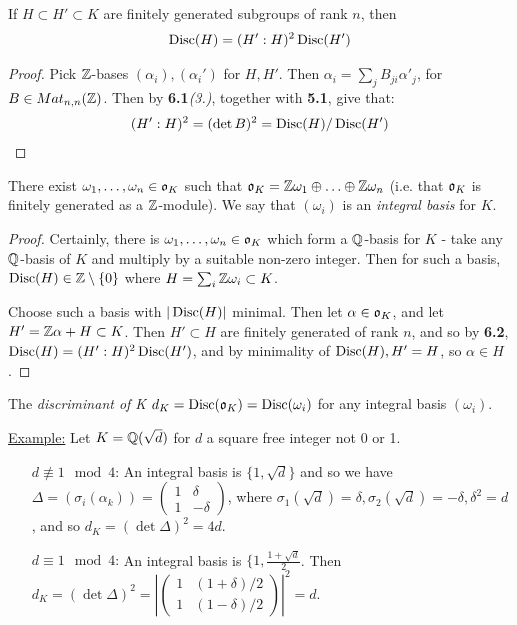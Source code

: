 \documentclass[10pt,a4paper]{article}
\begin{document}
\begin{lemma} If $H \subset H' \subset K$ are finitely generated subgroups of rank $n$, then
\begin{align*}
\operatorname{Disc}(H) = (H':H)^2\operatorname{Disc}(H')
\end{align*}
\end{lemma}
\begin{proof}
Pick $\mathbb{Z}$-bases $(\alpha_i), (\alpha_i')$ for $H, H'$. Then $\alpha_i = \sum_j B_{ji} \alpha'_j$, for $B \in Mat_{n,n}(\mathbb{Z})$. Then by \textbf{6.1}\textit{(3.)}, together with \textbf{5.1}, give that:
\begin{align*}
(H':H)^2 = (\det B)^2 = \operatorname{Disc}(H)/\operatorname{Disc}(H')
\end{align*}
\end{proof}

\begin{theorem}
There exist $\omega_1, \ldots, \omega_n \in \mathfrak{o}_K$ such that $\mathfrak{o}_K = \mathbb{Z}\omega_1\oplus\ldots\oplus\mathbb{Z}\omega_n$ (i.e. that $\mathfrak{o}_K$ is finitely generated as a $\mathbb{Z}$-module). We say that $(\omega_i)$ is an \emph{integral basis} for $K$.
\end{theorem}
\begin{proof}
Certainly, there is $\omega_1, \ldots, \omega_n \in \mathfrak{o}_K$ which form a $\mathbb{Q}$-basis for $K$ - take any $\mathbb{Q}$-basis of $K$ and multiply by a suitable non-zero integer. Then for such a basis, $\operatorname{Disc}(H) \in \mathbb{Z}\setminus\{0\}$ where $H = \sum_i \mathbb{Z}\omega_i \subset K$.

Choose such a basis with $|\operatorname{Disc}(H)|$ minimal. Then let $\alpha \in \mathfrak{o}_K$, and let $H' = \mathbb{Z}\alpha + H \subset K$. Then $H' \subset H$ are finitely generated of rank $n$, and so by \textbf{6.2}, $\operatorname{Disc}(H) = (H':H)^2\operatorname{Disc}(H')$, and by minimality of $\operatorname{Disc}(H), H' = H$, so $\alpha \in H$.
\end{proof}

The \emph{discriminant of K} $d_K = \operatorname{Disc}(\mathfrak{o}_K) = \operatorname{Disc}(\omega_i)$ for any integral basis $(\omega_i)$.

\hspace*{-1em}\underline{Example:} Let $K = \mathbb{Q}(\sqrt{d})$ for $d$ a square free integer not 0 or 1.
\begin{itemize}
\item[$d \nequiv 1 \mod 4$:] An integral basis is $\{1, \sqrt{d}\}$ and so we have $\Delta = (\sigma_i(\alpha_k)) = \begin{pmatrix} 1 & \delta \\ 1 & -\delta\end{pmatrix}$, where $\sigma_1(\sqrt{d}) = \delta, \sigma_2(\sqrt{d}) = -\delta, \delta^2 = d$, and so $d_K = (\det \Delta)^2 = 4d$.

\item[$d \equiv 1 \mod 4$:] An integral basis is $\{1, \frac{1+\sqrt{d}}{2}$. Then $d_K = (\det \Delta)^2 = \left|\begin{pmatrix} 1 & (1+\delta)/2 \\ 1 & (1-\delta)/2 \end{pmatrix}\right|^2 = d$.
\end{itemize}
\end{document}
